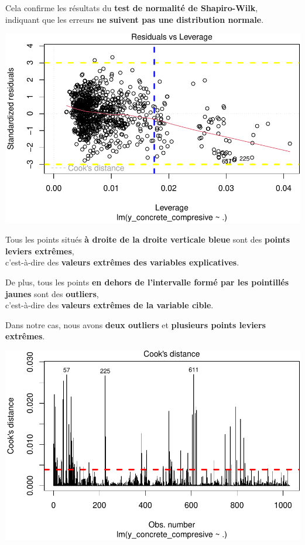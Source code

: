 \documentclass[
  12pt,
]{article}
\begin{document}
Cela confirme les résultats du \textbf{test de normalité de
Shapiro-Wilk},\\
indiquant que les erreurs \textbf{ne suivent pas une distribution
normale}.

\includegraphics{rmd_final_files/figure-latex/unnamed-chunk-38-1.pdf}

Tous les points situés \textbf{à droite de la droite verticale bleue}
sont des \textbf{points leviers extrêmes},\\
c'est-à-dire des \textbf{valeurs extrêmes des variables explicatives}.

De plus, tous les points \textbf{en dehors de l'intervalle formé par les
pointillés jaunes} sont des \textbf{outliers},\\
c'est-à-dire des \textbf{valeurs extrêmes de la variable cible}.

Dans notre cas, nous avons \textbf{deux outliers} et \textbf{plusieurs
points leviers extrêmes}.

\includegraphics{rmd_final_files/figure-latex/unnamed-chunk-39-1.pdf}
\end{document}
